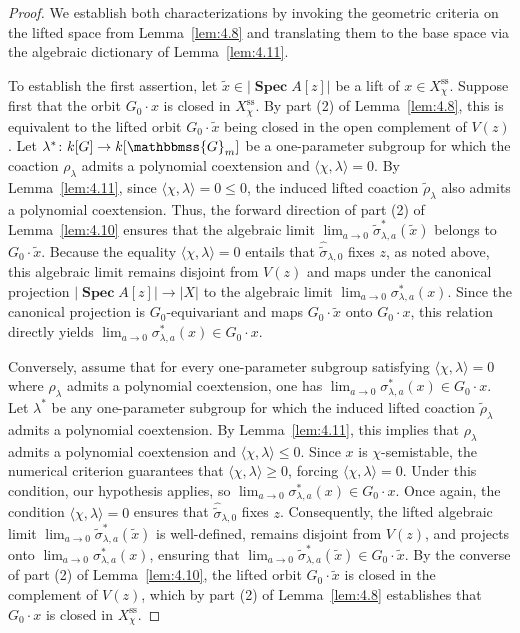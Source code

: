 \documentclass[11pt,a4paper,reqno,noamsfonts]{amsart}
\numberwithin{equation}{section}
\theoremstyle{definition}
\theoremstyle{remark}
\newcommand{\GG}{\ensuremath{\mathbbmss{G}}}
\newcommand{\uss}{\ensuremath{\mathrm{ss}}}
\DeclareMathOperator{\sSpec}{\mathbf{Spec}}
\begin{document}
\begin{proof}
We establish both characterizations by invoking the geometric criteria on the lifted space from Lemma~\ref{lem:4.8} and translating them to the base space via the algebraic dictionary of Lemma~\ref{lem:4.11}.

To establish the first assertion, let $\tilde{x} \in \lvert \sSpec A[z] \rvert$ be a lift of $x \in X_{\chi}^{\uss}$. Suppose first that the orbit $G_0 \cdot x$ is closed in $X_{\chi }^{\uss}$. By part (2) of Lemma~\ref{lem:4.8}, this is equivalent to the lifted orbit $G_0 \cdot \tilde{x}$ being closed in the open complement of $V(z)$. Let $\lambda^* \colon k[G] \to k[\GG_m]$ be a one-parameter subgroup for which the coaction $\rho _{\lambda }$ admits a polynomial coextension and $\langle \chi,\lambda \rangle = 0$. By Lemma~\ref{lem:4.11}, since $\langle \chi, \lambda \rangle = 0 \le 0$, the induced lifted coaction $\tilde{\rho }_{\lambda }$ also admits a polynomial coextension. Thus, the forward direction of part (2) of Lemma~\ref{lem:4.10} ensures that the algebraic limit $\displaystyle\lim_{a \to 0} \tilde{\sigma}_{\lambda,a}^*(\tilde{x})$ belongs to $G_0 \cdot \tilde{x}$. Because the equality $\langle \chi, \lambda \rangle = 0$ entails that $\hat{\tilde{\sigma}}_{\lambda,0}$ fixes $z$, as noted above, this algebraic limit remains disjoint from $V(z)$ and maps under the canonical projection $\lvert \sSpec A[z] \rvert \to \lvert X \rvert$ to the algebraic limit $\displaystyle\lim_{a \to 0} \sigma_{\lambda,a}^*(x)$. Since the canonical projection is $G_0$-equivariant and maps $G_0 \cdot \tilde{x}$ onto $G_0 \cdot x$, this relation directly yields $\displaystyle\lim_{a \to 0} \sigma_{\lambda,a}^*(x) \in G_0 \cdot x$.

Conversely, assume that for every one-parameter subgroup satisfying $\langle \chi,\lambda \rangle = 0$ where $\rho _{\lambda }$ admits a polynomial coextension, one has $\displaystyle\lim_{a \to 0} \sigma_{\lambda,a}^*(x) \in G_0 \cdot x$. Let $\lambda ^{*}$ be any one-parameter subgroup for which the induced lifted coaction $\tilde{\rho }_{\lambda }$ admits a polynomial coextension. By Lemma~\ref{lem:4.11}, this implies that $\rho _{\lambda }$ admits a polynomial coextension and $\langle \chi, \lambda \rangle \le 0$. Since $x$ is $\chi$-semistable, the numerical criterion guarantees that $\langle \chi, \lambda \rangle \ge 0$, forcing $\langle \chi, \lambda \rangle = 0$. Under this condition, our hypothesis applies, so $\displaystyle\lim_{a \to 0} \sigma_{\lambda,a}^*(x) \in G_0 \cdot x$. Once again, the condition $\langle \chi, \lambda \rangle = 0$ ensures that $\hat{\tilde{\sigma}}_{\lambda,0}$ fixes $z$. Consequently, the lifted algebraic limit $\lim_{a \to 0} \tilde{\sigma}_{\lambda,a}^*(\tilde{x})$ is well-defined, remains disjoint from $V(z)$, and projects onto $\displaystyle\lim_{a \to 0} \sigma_{\lambda,a}^*(x)$, ensuring that $\displaystyle\lim_{a \to 0} \tilde{\sigma}_{\lambda,a}^*(\tilde{x}) \in G_0 \cdot \tilde{x}$. By the converse of part (2) of Lemma~\ref{lem:4.10}, the lifted orbit $G_0 \cdot \tilde{x}$ is closed in the complement of $V(z)$, which by part (2) of Lemma~\ref{lem:4.8} establishes that $G_0 \cdot x$ is closed in $X_{\chi }^{\uss}$.


\end{proof}
\end{document}
